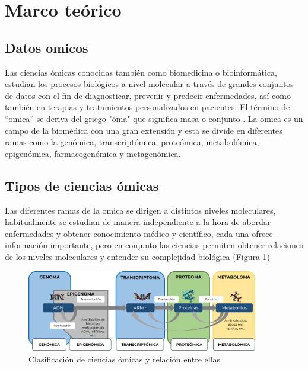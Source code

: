 \section{Marco teórico}

\subsection{Datos omicos}

Las ciencias ómicas conocidas también como biomedicina o bioinformática, estudian los procesos biológicos a nivel molecular a través de grandes conjuntos de datos con el fin de diagnosticar, prevenir y predecir enfermedades, así como también en terapias y tratamientos personalizados en pacientes. El término de “omica” se deriva del griego "óma" que significa masa o conjunto \citep{ravi2016deep,mamoshina2016applications}. La omica es un campo de la biomédica con una gran extensión y esta se divide en diferentes ramas como la genómica, transcriptómica, proteómica, metabolómica, epigenómica, farmacogenómica y metagenómica.\\

\subsection{Tipos de ciencias ómicas}

Las diferentes ramas de la omica se dirigen a distintos niveles moleculares, habitualmente se estudian de manera independiente a la hora de abordar enfermedades y obtener conocimiento médico y científico, cada una ofrece información importante, pero en conjunto las ciencias permiten obtener relaciones de los niveles moleculares y entender su complejidad biológica (Figura \ref{fig:tip_omic})

\begin{figure}[h!]
    \centering
    \includegraphics[width=0.9\textwidth]{Imagenes/Tip_omic.png}
    \caption{Clasificación de ciencias ómicas y relación entre ellas}
    \label{fig:tip_omic}
\end{figure}



